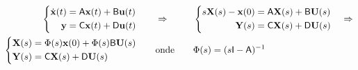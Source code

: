 \begin{alignat}{3}
\left\{\begin{aligned} %
\dot{\mathbf{x}}(t) &= \mathsf{A}\mathbf{x}(t)+\mathsf{B}\mathbf{u}(t) \\
\mathbf{y} &= \mathsf{C}\mathbf{x}(t)+\mathsf{D}\mathbf{u}(t)
\end{aligned}\right.&
&
&\implica
&
&\left\{\begin{aligned} %
s\mathbf{X}(s)-\mathbf{x}(0)&=\mathsf{A}\mathbf{X}(s)+\mathsf{B}\mathbf{U}(s)\\
\mathbf{Y}(s) &= \mathsf{C}\mathbf{X}(s)+\mathsf{D}\mathbf{U}(s)
\end{aligned}\right.\implicafim
\nonumber
\\
\left\{\begin{aligned} %
\mathbf{X}(s) &= \Phi(s)\mathbf{x}(0) + \Phi(s)\mathsf{B}\mathbf{U}(s) \\
\mathbf{Y}(s) &= \mathsf{C}\mathbf{X}(s)+\mathsf{D}\mathbf{U}(s)
\end{aligned}\right.&
&
&\quad \text{onde} \quad
&
&\Phi(s) = (s\mathsf{I}-\mathsf{A})^{-1}
\label{Eq:alinhamento}
\end{alignat}
